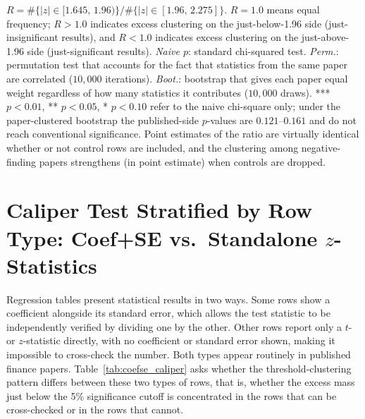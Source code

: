 \documentclass[12pt]{article}
\begin{document}
\begin{table}[ht]
\begin{singlespace}
\begin{minipage}{\textwidth}
$R = \#\{|z|\in[1.645,\,1.96)\}/\#\{|z|\in[1.96,\,2.275]\}$.
$R = 1.0$ means equal frequency; $R > 1.0$ indicates excess clustering on the
just-below-1.96 side (just-insignificant results), and $R < 1.0$ indicates
excess clustering on the just-above-1.96 side (just-significant results).
\textit{Naive $p$}: standard chi-squared test.
\textit{Perm.}: permutation test that accounts for the fact that statistics
from the same paper are correlated ($10{,}000$ iterations).
\textit{Boot.}: bootstrap that gives each paper equal weight regardless of how
many statistics it contributes ($10{,}000$ draws).
*** $p < 0.01$, ** $p < 0.05$, * $p < 0.10$ refer to the naive
chi-square only; under the paper-clustered bootstrap the published-side
$p$-values are $0.121$--$0.161$ and do not reach conventional significance.
Point estimates of the ratio are virtually identical whether or not control
rows are included, and the clustering among negative-finding papers
strengthens (in point estimate) when controls are dropped.
\end{minipage}
\end{singlespace}
\end{table}

\section{Caliper Test Stratified by Row Type: Coef+SE vs.\ Standalone $z$-Statistics}
\label{app:coefse_caliper}
\label{app:coefse_detail}

Regression tables present statistical results in two ways.
Some rows show a coefficient alongside its standard error, which allows
the test statistic to be independently verified by dividing one by the other.
Other rows report only a $t$- or $z$-statistic directly, with no coefficient
or standard error shown, making it impossible to cross-check the number.
Both types appear routinely in published finance papers.
Table~\ref{tab:coefse_caliper} asks whether the threshold-clustering pattern
differs between these two types of rows, that is, whether the excess mass
just below the 5\% significance cutoff is concentrated in the rows that
can be cross-checked or in the rows that cannot.
\end{document}

